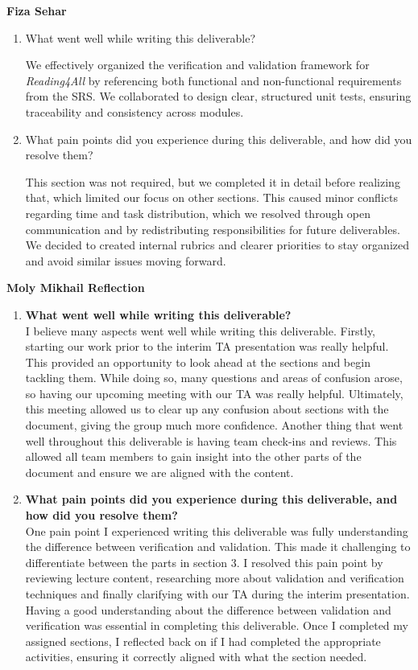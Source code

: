 \documentclass[12pt, titlepage]{article}
\begin{document}
\textbf{Fiza Sehar}
\begin{enumerate}
  \item What went well while writing this deliverable?

    We effectively organized the verification and validation framework
    for \textit{Reading4All} by referencing both functional and
    non-functional requirements from the SRS. We collaborated to design
    clear, structured unit tests, ensuring traceability and consistency
    across modules.

  \item What pain points did you experience during this deliverable,
    and how did you resolve them?

    This section was not required, but we completed it in detail before
    realizing that, which limited our focus on other sections. This
    caused minor conflicts regarding time and task distribution, which
    we resolved through open communication and by redistributing
    responsibilities for future deliverables. We decided to created
    internal rubrics and clearer priorities to stay organized and avoid
    similar issues moving forward.

\end{enumerate}

\textbf{Moly Mikhail Reflection}
\begin{enumerate}
  \item \textbf{What went well while writing this deliverable?}\\
    I believe many aspects went well while writing this deliverable.
    Firstly, starting our work prior to the interim TA presentation
    was really helpful.
    This provided an opportunity to look ahead at the sections and
    begin tackling them. While doing so, many questions and areas of
    confusion arose, so having our upcoming meeting with our TA was
    really helpful.
    Ultimately, this meeting allowed us to clear up any confusion
    about sections with the document, giving the group much more
    confidence. Another thing that went well throughout this
    deliverable is having team check-ins and reviews.
    This allowed all team members to gain insight into the other
    parts of the document and ensure we are aligned with the content.
  \item \textbf{What pain points did you experience during this
      deliverable, and how
    did you resolve them?}\\
    One pain point I experienced writing this deliverable was fully
    understanding the difference between verification and validation.
    This made it challenging to differentiate between the parts in section 3.
    I resolved this pain point by reviewing lecture content,
    researching more about validation and verification techniques and
    finally clarifying with our TA during the interim presentation.
    Having a good understanding about the difference between
    validation and verification was essential in completing this
    deliverable. Once I completed
    my assigned sections, I reflected back on if I had completed the
    appropriate activities, ensuring it correctly aligned with what
    the section needed.
\end{enumerate}
\end{document}
